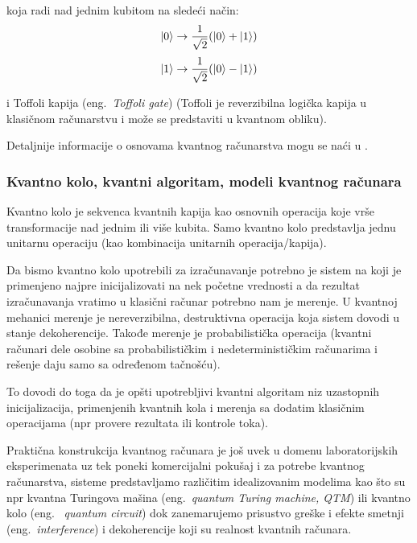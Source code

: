 \documentclass[a4paper]{article}
\begin{document}
{\smallskip
koja radi nad jednim kubitom na sledeći način:\\
\smallskip
\begin{equation*}
\ket{0} \rightarrow \frac{1}{\sqrt{2}}(\ket{0} + \ket{1})
\end{equation*}
\smallskip
\begin{equation*}
\ket{1} \rightarrow \frac{1}{\sqrt{2}}(\ket{0} - \ket{1})\\
\end{equation*}

i Toffoli kapija (eng.~\emph{Toffoli gate}) (Toffoli je reverzibilna logička kapija u klasičnom računarstvu i može se predstaviti u kvantnom obliku).

Detaljnije informacije o osnovama kvantnog računarstva mogu se naći u \cite{knjiga}.

\subsubsection{Kvantno kolo, kvantni algoritam, modeli kvantnog računara}
\label{modeli}

Kvantno kolo je sekvenca kvantnih kapija kao osnovnih operacija koje vrše transformacije nad jednim ili više kubita. Samo kvantno kolo predstavlja jednu unitarnu operaciju (kao kombinacija unitarnih operacija/kapija).

Da bismo kvantno kolo upotrebili za izračunavanje potrebno je sistem na koji je primenjeno najpre inicijalizovati na nek početne vrednosti a da rezultat izračunavanja vratimo u klasični računar potrebno nam je merenje. U kvantnoj mehanici merenje je nereverzibilna, destruktivna operacija koja sistem dovodi u stanje dekoherencije. Takođe merenje je probabilistička operacija (kvantni računari dele osobine sa probabilističkim i nedeterminističkim računarima i rešenje daju samo sa određenom tačnošću).

To dovodi do toga da je opšti upotrebljivi kvantni algoritam niz uzastopnih inicijalizacija, primenjenih kvantnih kola i merenja sa dodatim klasičnim operacijama (npr provere rezultata ili kontrole toka).

Praktična konstrukcija kvantnog računara je još uvek u domenu laboratorijskih eksperimenata uz tek poneki komercijalni pokušaj i za potrebe kvantnog računarstva, sisteme predstavljamo različitim idealizovanim modelima kao što su npr kvantna Turingova mašina (eng.~\emph{quantum Turing machine, QTM}) ili kvantno kolo (eng. ~\emph{quantum circuit}) dok zanemarujemo prisustvo greške i efekte smetnji (eng.~\emph{interference}) i dekoherencije koji su realnost kvantnih računara.

}
\end{document}
